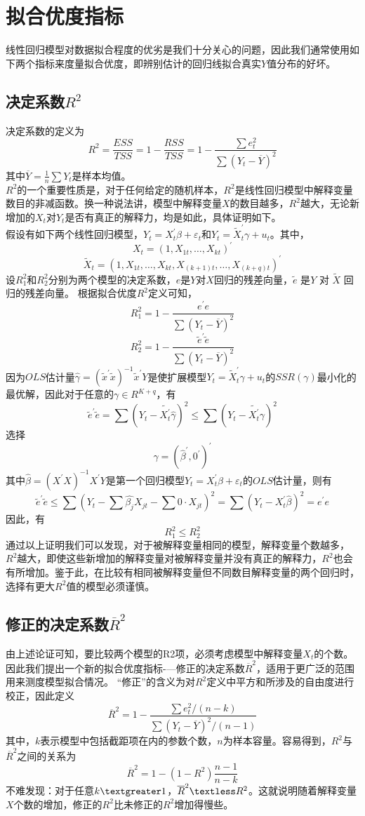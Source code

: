 \documentclass[12pt,a4paper]{article}
\begin{document}
 \section{拟合优度指标}
线性回归模型对数据拟合程度的优劣是我们十分关心的问题，因此我们通常使用如下两个指标来度量拟合优度，即辨别估计的回归线拟合真实$Y$值分布的好坏。
\subsection{决定系数$R^{2}$}
决定系数的定义为$$R^{2}=\frac{ESS}{TSS}=1-\frac{RSS}{TSS}=1-\frac{\sum e_{t}^{2}}{\sum(Y_{t}-\overline{Y})^{2}}$$
其中$\overline{Y}=\frac{1}{n}\sum Y_{t} $是样本均值。 \\
\indent
$R^{2}$的一个重要性质是，对于任何给定的随机样本，$R^{2}$是线性回归模型中解释变量数目的非减函数。换一种说法讲，模型中解释变量$X$的数目越多，$R^{2}$越大，无论新增加的$X_{t}$对$Y_{t}$是否有真正的解释力，均是如此，具体证明如下。\\
\indent
假设有如下两个线性回归模型，$Y_{t}=X_{t}^{'}\beta+\varepsilon_{t}$和$Y_{t}=\widetilde{X}_{t}^{'}\gamma+u_{t}$。其中，$$X_{t}=(1,X_{1t},…,X_{kt})^{'}$$
$$\widetilde{X}_{t}=(1,X_{1t},…,X_{kt},X_{(k+1)t},…,X_{(k+q)t})^{'}$$
\indent
设$R_{1}^{2}$和$R_{2}^{2}$分别为两个模型的决定系数，$e$是$Y$对$X$回归的残差向量，$\widetilde{e}$ 是$Y$ 对 $\widetilde{X}$ 回归的残差向量。
根据拟合优度$R^{2}$定义可知，
$$R_{1}^{2}=1-\frac{e^{'}e}{\sum(Y_{t}-\overline{Y})^{2}}$$
$$R_{2}^{2}=1-\frac{\widetilde{e}^{'}\widetilde{e}}{\sum(Y_{t}-\overline{Y})^{2}}$$
\indent
因为$OLS$估计量$\widehat{\gamma}=(\widetilde{x}^{'}\widetilde{x})^{-1}\widetilde{x}^{'}Y$是使扩展模型$Y_{t}=\widetilde{X}_{t}^{'}\gamma+u_{t}$的$SSR(\gamma)$最小化的最优解，因此对于任意的$\gamma \in R^{K+q}$，有$$\widetilde{e}^{'}\widetilde{e}=\sum (Y_{t}-\widetilde{X_{t}^{'}}\widehat{\gamma})^{2}\leq\sum(Y_{t}-\widetilde{X_{t}^{'}}\gamma)^{2}$$
选择$$\gamma=(\widehat{\beta}^{'},0^{'})^{'}$$
其中$\widehat{\beta}=(X^{'}X)^{-1}X^{'}Y$是第一个回归模型$Y_{t}=X_{t}^{'}\beta+\varepsilon_{t}$的$OLS$估计量，则有
$$\widetilde{e}^{'}\widetilde{e}\leq\sum(Y_{t}-\sum\widehat{\beta_{j}}X_{j t}-\sum 0 \cdot X_{j t})^{2}=\sum(Y_{t}-X_{t}^{'}\widehat{\beta})^{2}=e^{'}e$$
因此，有$$R_{1}^{2}\leq R_{2}^{2}$$
\indent
通过以上证明我们可以发现，对于被解释变量相同的模型，解释变量个数越多，$R^{2}$越大，即使这些新增加的解释变量对被解释变量并没有真正的解释力，$R^{2}$也会有所增加。鉴于此，在比较有相同被解释变量但不同数目解释变量的两个回归时，选择有更大$R^{2}$值的模型必须谨慎。
\subsection{修正的决定系数$\overline{R}^{2}$}
\indent
由上述论证可知，要比较两个模型的R2项，必须考虑模型中解释变量$X_{t}$的个数。因此我们提出一个新的拟合优度指标-—修正的决定系数$\overline{R}^{2}$，适用于更广泛的范围用来测度模型拟合情况。
“修正”的含义为对$R^{2}$定义中平方和所涉及的自由度进行校正，因此定义  $$\overline{R}^{2}=1-\frac{\sum e_{t}^{2}/(n-k)}{\sum(Y_{t}-\overline{Y})^{2}/(n-1)}$$ 其中，$k$表示模型中包括截距项在内的参数个数，$n$为样本容量。容易得到，$R^{2}$与$\overline{R}^{2}$之间的关系为
$$\overline{R}^{2}=1-(1-R^{2})\frac{n-1}{n-k}$$
\indent
不难发现：对于任意$k\textgreater 1$，$\overline{R}^{2}\textless R^{2}$。这就说明随着解释变量$X$个数的增加，修正的$R^{2}$比未修正的$R^{2}$增加得慢些。
\end{document}
